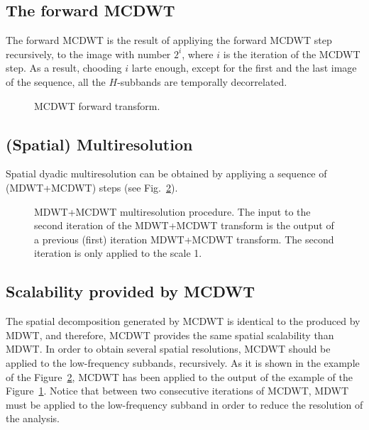 \subsection{The forward MCDWT}
The forward MCDWT is the result of appliying the forward MCDWT step
recursively, to the image with number $2^i$, where $i$ is the
iteration of the MCDWT step. As a result, chooding $i$ larte enough,
except for the first and the last image of the sequence, all the
$H$-subbands are temporally decorrelated.

\begin{figure}
  \centering
  \caption{MCDWT forward transform.}
  \label{fig:forward_MCDWT}
\end{figure}


\subsection{(Spatial) Multiresolution}
Spatial dyadic multiresolution can be obtained by appliying a sequence
of (MDWT+MCDWT) steps (see Fig.~\ref{fig:multiresolution}).

\begin{figure}
  \centering
  \caption{MDWT+MCDWT multiresolution procedure. The input to the second
    iteration of the MDWT+MCDWT transform is the output of a previous
    (first) iteration MDWT+MCDWT transform. The second iteration is only
    applied to the scale 1.}
  \label{fig:multiresolution}
\end{figure}

\subsection{Scalability provided by MCDWT}
The spatial decomposition generated by MCDWT is identical to the
produced by MDWT, and therefore, MCDWT provides the same spatial
scalability than MDWT. In order to obtain several spatial resolutions,
MCDWT should be applied to the low-frequency subbands, recursively. As
it is shown in the example of the Figure~\ref{fig:multiresolution},
MCDWT has been applied to the output of the example of the
Figure~\ref{fig:forward_MCDWT}. Notice that between two consecutive
iterations of MCDWT, MDWT must be applied to the low-frequency subband
in order to reduce the resolution of the analysis.

